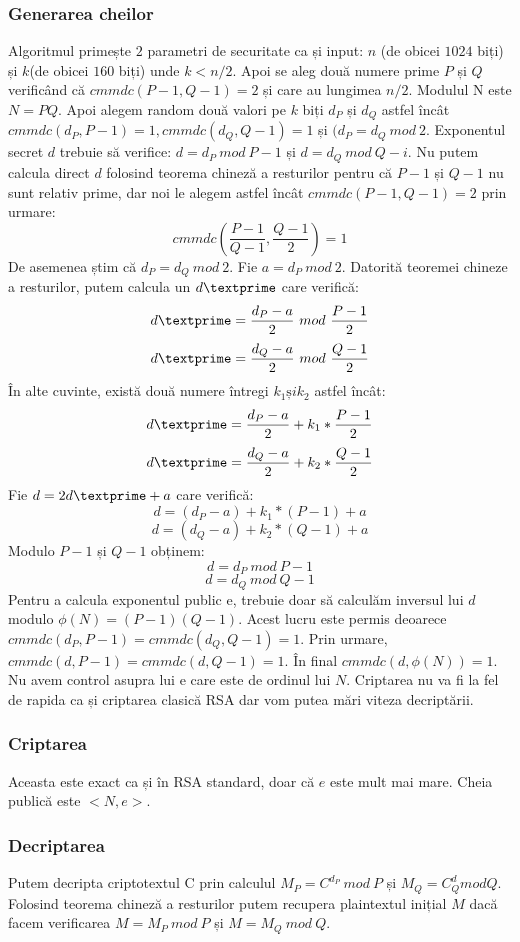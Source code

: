 \documentclass[12]{report}
\begin{document}
	    \subsubsection{Generarea cheilor}
	    Algoritmul primește $2$ parametri de securitate ca și input: $n$ (de obicei $1024$ biți) și $k$(de obicei $160$ biți) unde $k<n/2$. Apoi se aleg două numere prime $P$ și $Q$ verificând că $cmmdc(P-1,Q-1)=2$ și care au lungimea $n/2$. Modulul N este $N=PQ$. Apoi alegem random două valori pe $k$ biți $d_P$ și $d_Q$ astfel încât $cmmdc(d_P,P-1)=1, cmmdc(d_Q,Q-1)=1$ și $(d_P=d_Q \ mod \ 2$. Exponentul secret $d$ trebuie să verifice: $d=d_P \ mod \ P-1$ și $d=d_Q \ mod \ Q-i$. Nu putem calcula direct $d$ folosind teorema chineză a resturilor pentru că $P-1$ și $Q-1$ nu sunt relativ prime, dar noi le alegem astfel încât $cmmdc(P-1,Q-1)=2$ prin urmare:
	    $$cmmdc(\frac{P-1}{Q-1},\frac{Q-1}{2} )=1  $$
	     De asemenea știm că $ d_P=d_Q \ mod \ 2$. Fie $ a=d_P \ mod \ 2 $. Datorită teoremei chineze a resturilor, putem calcula un $d\textprime$ care verifică:
	    $$d\textprime = \frac{d_P-a}{2} \ mod \ \frac{P-1}{2} $$
	    $$d\textprime = \frac{d_Q-a}{2} \ mod \ \frac{Q-1}{2} $$
	    În alte cuvinte, există două numere întregi $k_1 și k_2$ astfel încât: 
	    $$d\textprime = \frac{d_P-a}{2} + k_1 * \frac{P-1}{2} $$
	    $$d\textprime = \frac{d_Q-a}{2} + k_2 * \frac{Q-1}{2} $$
	    Fie $ d=2d\textprime +a$ care verifică:
	    $$ d=(d_P-a) + k_1 * (P-1) +a$$
	    $$ d=(d_Q-a) + k_2 * (Q-1) +a$$
	    Modulo $P-1$ și $Q-1$ obținem:
	    $$d=d_P \ mod \ P-1$$
	    $$d=d_Q \ mod \ Q-1$$
	    Pentru a calcula exponentul public e, trebuie doar să calculăm inversul lui $d$ modulo $\phi(N)=(P-1)(Q-1)$. Acest lucru este permis deoarece $cmmdc(d_P,P-1)=cmmdc(d_Q,Q-1)=1$. Prin urmare, $cmmdc(d,P-1)=cmmdc(d,Q-1)=1$. În final $cmmdc(d,\phi(N))=1$. Nu avem control asupra lui e care este de ordinul lui $N$. Criptarea nu va fi la fel de rapida ca și criptarea clasică RSA dar vom putea mări viteza decriptării.
	   \subsubsection{Criptarea}
	    Aceasta este exact ca și în RSA standard, doar că $e$ este mult mai mare. Cheia publică este $<N,e>$.
	    \subsubsection{Decriptarea}
	    Putem decripta criptotextul C prin calculul $M_P = C^{d_P} \ mod \ P$ și $M_Q=C^d_Q mod Q$. Folosind teorema chineză a resturilor putem recupera plaintextul inițial $M$ dacă facem verificarea $M=M_P \ mod \ P$ și $M=M_Q \ mod \ Q$.
	    
\end{document}
